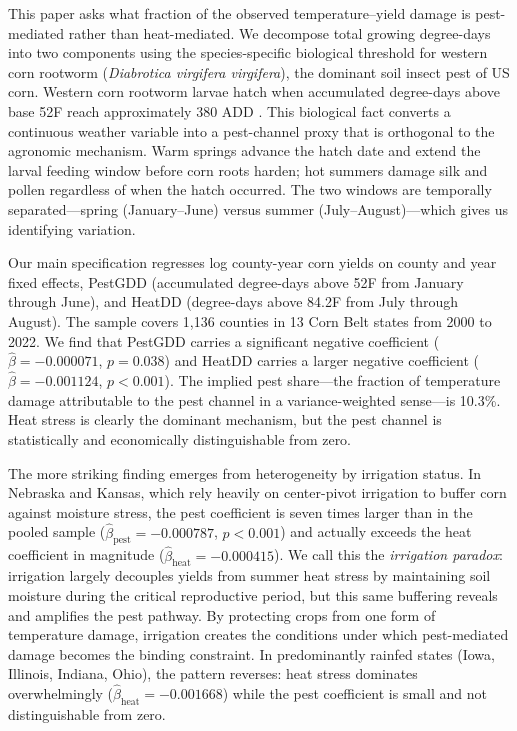 \documentclass[12pt]{article}
\begin{document}
This paper asks what fraction of the observed temperature--yield damage is pest-mediated rather than heat-mediated. We decompose total growing degree-days into two components using the species-specific biological threshold for western corn rootworm (\textit{Diabrotica virgifera virgifera}), the dominant soil insect pest of US corn. Western corn rootworm larvae hatch when accumulated degree-days above base 52\textdegree{}F reach approximately 380 ADD \citep{jarvis1994phenology, gray2009western}. This biological fact converts a continuous weather variable into a pest-channel proxy that is orthogonal to the agronomic mechanism. Warm springs advance the hatch date and extend the larval feeding window before corn roots harden; hot summers damage silk and pollen regardless of when the hatch occurred. The two windows are temporally separated---spring (January--June) versus summer (July--August)---which gives us identifying variation.

Our main specification regresses log county-year corn yields on county and year fixed effects, PestGDD (accumulated degree-days above 52\textdegree{}F from January through June), and HeatDD (degree-days above 84.2\textdegree{}F from July through August). The sample covers 1,136 counties in 13 Corn Belt states from 2000 to 2022. We find that PestGDD carries a significant negative coefficient ($\hat{\beta} = -0.000071$, $p = 0.038$) and HeatDD carries a larger negative coefficient ($\hat{\beta} = -0.001124$, $p < 0.001$). The implied pest share---the fraction of temperature damage attributable to the pest channel in a variance-weighted sense---is 10.3\%. Heat stress is clearly the dominant mechanism, but the pest channel is statistically and economically distinguishable from zero.

The more striking finding emerges from heterogeneity by irrigation status. In Nebraska and Kansas, which rely heavily on center-pivot irrigation to buffer corn against moisture stress, the pest coefficient is seven times larger than in the pooled sample ($\hat{\beta}_{\text{pest}} = -0.000787$, $p < 0.001$) and actually exceeds the heat coefficient in magnitude ($\hat{\beta}_{\text{heat}} = -0.000415$). We call this the \textit{irrigation paradox}: irrigation largely decouples yields from summer heat stress by maintaining soil moisture during the critical reproductive period, but this same buffering reveals and amplifies the pest pathway. By protecting crops from one form of temperature damage, irrigation creates the conditions under which pest-mediated damage becomes the binding constraint. In predominantly rainfed states (Iowa, Illinois, Indiana, Ohio), the pattern reverses: heat stress dominates overwhelmingly ($\hat{\beta}_{\text{heat}} = -0.001668$) while the pest coefficient is small and not distinguishable from zero.
\end{document}
